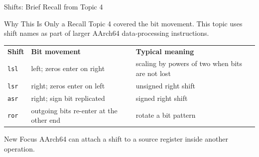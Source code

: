\documentclass[aspectratio=169,11pt,t]{beamer}
\newcommand{\code}[1]{\texttt{#1}}
\begin{document}
\begin{frame}{Shifts: Brief Recall from Topic 4}
\begin{block}{Why This Is Only a Recall}
Topic 4 covered the bit movement. This topic uses shift names as part of larger AArch64 data-processing instructions.
\end{block}
\vspace{0.15cm}
\begin{center}
\small
\renewcommand{\arraystretch}{1.15}
\begin{tabular}{>{\raggedright\arraybackslash}m{2.2cm}>{\raggedright\arraybackslash}m{4.4cm}>{\raggedright\arraybackslash}m{4.8cm}}
\rowcolor{navy}
{\color{white}\bfseries Shift} & {\color{white}\bfseries Bit movement} & {\color{white}\bfseries Typical meaning} \\
\rowcolor{softgray}
\code{lsl} & left; zeros enter on right & scaling by powers of two when bits are not lost \\
\rowcolor{white}
\code{lsr} & right; zeros enter on left & unsigned right shift \\
\rowcolor{softgray}
\code{asr} & right; sign bit replicated & signed right shift \\
\rowcolor{white}
\code{ror} & outgoing bits re-enter at the other end & rotate a bit pattern \\
\end{tabular}
\end{center}
\vspace{0.15cm}
\begin{block}{New Focus}
AArch64 can attach a shift to a source register inside another operation.
\end{block}
\end{frame}









\end{document}
